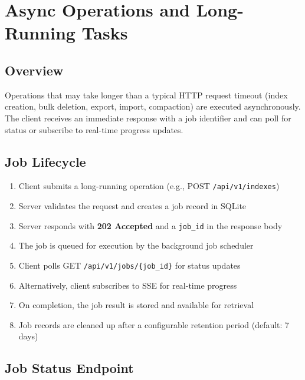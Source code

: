 \documentclass[11pt,a4paper]{article}
\newcommand{\inlinecode}[1]{\texttt{\small\colorbox{ctCodeBg}{#1}}}
\newcommand{\apipath}[1]{\texttt{\small\textcolor{ctAccentBlue}{#1}}}
\begin{document}
\section{Async Operations and Long-Running Tasks}

\subsection{Overview}

Operations that may take longer than a typical HTTP request timeout (index creation, bulk deletion, export, import, compaction) are executed asynchronously. The client receives an immediate response with a job identifier and can poll for status or subscribe to real-time progress updates.

\subsection{Job Lifecycle}

\begin{enumerate}
    \item Client submits a long-running operation (e.g., POST \apipath{/api/v1/indexes})
    \item Server validates the request and creates a job record in SQLite
    \item Server responds with \textbf{202 Accepted} and a \inlinecode{job\_id} in the response body
    \item The job is queued for execution by the background job scheduler
    \item Client polls GET \apipath{/api/v1/jobs/\{job\_id\}} for status updates
    \item Alternatively, client subscribes to SSE for real-time progress
    \item On completion, the job result is stored and available for retrieval
    \item Job records are cleaned up after a configurable retention period (default: 7 days)
\end{enumerate}

\subsection{Job Status Endpoint}
\end{document}
